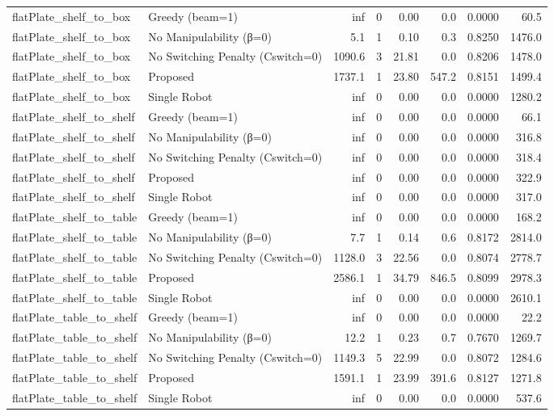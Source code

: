 \begin{table}[ht]
{\begin{tabular}{l l r r r r r r}
  flatPlate\_shelf\_to\_box & Greedy (beam=1) & inf & 0 & 0.00 & 0.0 & 0.0000 & 60.5 \\
  flatPlate\_shelf\_to\_box & No Manipulability (β=0) & 5.1 & 1 & 0.10 & 0.3 & 0.8250 & 1476.0 \\
  flatPlate\_shelf\_to\_box & No Switching Penalty (Cswitch=0) & 1090.6 & 3 & 21.81 & 0.0 & 0.8206 & 1478.0 \\
  flatPlate\_shelf\_to\_box & Proposed & 1737.1 & 1 & 23.80 & 547.2 & 0.8151 & 1499.4 \\
  flatPlate\_shelf\_to\_box & Single Robot & inf & 0 & 0.00 & 0.0 & 0.0000 & 1280.2 \\
  flatPlate\_shelf\_to\_shelf & Greedy (beam=1) & inf & 0 & 0.00 & 0.0 & 0.0000 & 66.1 \\
  flatPlate\_shelf\_to\_shelf & No Manipulability (β=0) & inf & 0 & 0.00 & 0.0 & 0.0000 & 316.8 \\
  flatPlate\_shelf\_to\_shelf & No Switching Penalty (Cswitch=0) & inf & 0 & 0.00 & 0.0 & 0.0000 & 318.4 \\
  flatPlate\_shelf\_to\_shelf & Proposed & inf & 0 & 0.00 & 0.0 & 0.0000 & 322.9 \\
  flatPlate\_shelf\_to\_shelf & Single Robot & inf & 0 & 0.00 & 0.0 & 0.0000 & 317.0 \\
  flatPlate\_shelf\_to\_table & Greedy (beam=1) & inf & 0 & 0.00 & 0.0 & 0.0000 & 168.2 \\
  flatPlate\_shelf\_to\_table & No Manipulability (β=0) & 7.7 & 1 & 0.14 & 0.6 & 0.8172 & 2814.0 \\
  flatPlate\_shelf\_to\_table & No Switching Penalty (Cswitch=0) & 1128.0 & 3 & 22.56 & 0.0 & 0.8074 & 2778.7 \\
  flatPlate\_shelf\_to\_table & Proposed & 2586.1 & 1 & 34.79 & 846.5 & 0.8099 & 2978.3 \\
  flatPlate\_shelf\_to\_table & Single Robot & inf & 0 & 0.00 & 0.0 & 0.0000 & 2610.1 \\
  flatPlate\_table\_to\_shelf & Greedy (beam=1) & inf & 0 & 0.00 & 0.0 & 0.0000 & 22.2 \\
  flatPlate\_table\_to\_shelf & No Manipulability (β=0) & 12.2 & 1 & 0.23 & 0.7 & 0.7670 & 1269.7 \\
  flatPlate\_table\_to\_shelf & No Switching Penalty (Cswitch=0) & 1149.3 & 5 & 22.99 & 0.0 & 0.8072 & 1284.6 \\
  flatPlate\_table\_to\_shelf & Proposed & 1591.1 & 1 & 23.99 & 391.6 & 0.8127 & 1271.8 \\
  flatPlate\_table\_to\_shelf & Single Robot & inf & 0 & 0.00 & 0.0 & 0.0000 & 537.6 \\

\end{tabular}}
\end{table}
